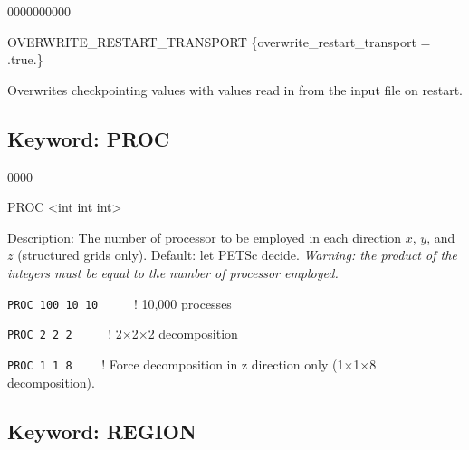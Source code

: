 \hfill\hyperlink{target_key}{\return}

\begin{deflist}{0000000000}
\item[OVERWRITE\_RESTART\_TRANSPORT] \{overwrite\_restart\_transport = .true.\}
\end{deflist}

Overwrites checkpointing values with values read in from the input file on restart.

\hyperlink{target_key}{\return}




\newpage
\protect\hypertarget{target_proc}{}

\subsection{Keyword: PROC}

\hfill\hyperlink{target_key}{\return}

\begin{deflist}{0000}
\item[PROC] <int int int> 
\item[Description:] The number of processor to be employed in each direction $x$, $y$, and $z$ (structured grids only). Default: let PETSc decide. {\em Warning: the product of the integers must be equal to the number of processor employed.}
\end{deflist}

\begin{mdframed}

\footnotesize

{\tt PROC 100 10 10} \ \ \ \ \ ! 10,000 processes

{\tt PROC 2 2 2} \ \ \ \ \ ! 2$\times$2$\times$2 decomposition

{\tt PROC 1 1 8} \ \ \ \ ! Force decomposition in z direction only (1$\times$1$\times$8 decomposition).
\normalsize
\end{mdframed}

\hyperlink{target_key}{\return}


\newpage
\protect\hypertarget{target_region}{}


\subsection{Keyword: REGION}

